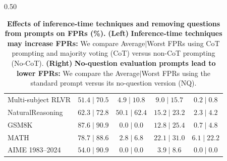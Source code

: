 \begin{table}[htbp]
\begin{subtable}{0.50\textwidth}
{\begin{tabular}{lcccc}
        \midrule
        Multi-subject RLVR & $51.4\mid70.5$ & $\mathbf{4.9}\mid\mathbf{10.8}$  & $9.0\mid15.7$  & $\mathbf{0.2}\mid\mathbf{0.8}$ \\
        NaturalReasoning   & $62.3\mid72.8$ & $\mathbf{50.1}\mid\mathbf{62.4}$ & $15.2\mid23.2$ & $\mathbf{2.3}\mid\mathbf{4.2}$ \\
        GSM8K              & $87.6\mid90.9$ & $\mathbf{0.0}\mid\mathbf{0.0}$   & $12.8\mid25.4$ & $\mathbf{0.7}\mid\mathbf{4.8}$ \\
        MATH               & $78.7\mid88.6$ & $\mathbf{2.8}\mid\mathbf{6.8}$   & $22.1\mid31.0$ & $\mathbf{6.1}\mid\mathbf{22.2}$ \\
        AIME 1983--2024    & $54.0\mid90.9$ & $\mathbf{0.0}\mid\mathbf{0.0}$   & $3.9\mid8.6$   & $\mathbf{0.0}\mid\mathbf{0.0}$ \\
        \bottomrule
        \end{tabular}
        }
        \caption{}
        \label{tab:fpr_nq_main}
    \end{subtable}
    \vspace{-2mm} %
    \caption{\textbf{Effects of inference-time techniques and removing questions from prompts on FPRs (\%).} 
    \textbf{(Left)} \textbf{Inference-time techniques may increase FPRs:} We compare Average$\mid$Worst FPRs using CoT prompting and majority voting (CoT) versus non-CoT prompting (No-CoT). 
    \textbf{(Right)} \textbf{No-question evaluation prompts lead to lower FPRs:} We compare the Average$\mid$Worst FPRs using the standard prompt versus its no-question version (NQ). }
    \vspace{-2pt}
\end{table}

